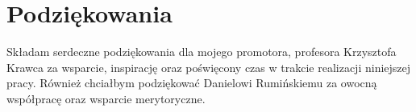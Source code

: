 %

\chapter*{Podziękowania}
\label{sec:acknowledgement}
\vspace*{-10mm}

Składam serdeczne podziękowania dla mojego promotora, profesora Krzysztofa Krawca za wsparcie, inspirację oraz poświęcony czas w trakcie realizacji niniejszej pracy. Również chciałbym podziękować Danielowi Rumińskiemu za owocną współpracę oraz wsparcie merytoryczne.
